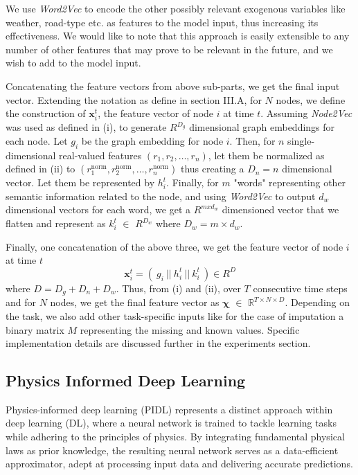 \documentclass[conference]{IEEEtran}
\begin{document}
We use \textit{Word2Vec} to encode the other possibly relevant exogenous variables like weather, road-type etc. as features to the model input, thus increasing its effectiveness. We would like to note that this approach is easily extensible to any number of other features that may prove to be relevant in the future, and we wish to add to the model input.

\vspace{3ex} Concatenating the feature vectors from above sub-parts, we get the final input vector. Extending the notation as define in section III.A, for \(N\) nodes, we define the construction of \(\mathbf{x}_i^t\), the feature vector of node \(i\) at time \(t\). Assuming \textit{Node2Vec} was used as defined in (i), to generate \(R^{D_g}\) dimensional graph embeddings for each node. Let \(g_i\) be the graph embedding for node \(i\). Then, for \(n\) single-dimensional real-valued features \((r_1, r_2, \ldots, r_n)\), let them be normalized as defined in (ii) to \((r_1^{\text{norm}}, r_2^{\text{norm}}, \ldots, r_n^{\text{norm}})\) thus creating a \(D_n = n\) dimensional vector. Let them be represented by \(h_i^t\). Finally, for \(m\) "words" representing other semantic information related to the node, and using \textit{Word2Vec} to output \(d_w\) dimensional vectors for each word, we get a \(R^{mxd_w}\) dimensioned vector that we flatten and represent as \(k_i^t\) \(\in\) \(R^{D_w}\) where \(D_w = m \times d_w\).

Finally, one concatenation of the above three, we get the feature vector of node \(i\) at time \(t\) 
\[\mathbf{x}_i^t = (\ g_i\ ||\ h_i^t\ ||\ k_i^t\ ) \in R^D\] 
where \(D = D_g+D_n+D_w\).
Thus, from (i) and (ii), over \( T \) consecutive time steps and for \( N \) nodes, we get the final feature vector as \( \mathbf{\chi} \)  \(\in\) \( \mathbb{R}^{T \times N \times D} \).
Depending on the task, we also add other task-specific inputs like for the case of imputation a binary matrix \( M \) representing the missing and known values. Specific implementation details are discussed further in the experiments section.

\subsection{\textbf{Physics Informed Deep Learning}}

Physics-informed deep learning (PIDL) represents a distinct approach within deep learning (DL), where a neural network is trained to tackle learning tasks while adhering to the principles of physics. By integrating fundamental physical laws as prior knowledge, the resulting neural network serves as a data-efficient approximator, adept at processing input data and delivering accurate predictions.
\end{document}
